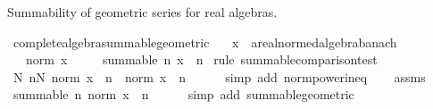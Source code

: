 \begin{isabellebody}
\isamarkupfalse%
%
\endisatagproof
{\isafoldproof}%
%
\isadelimproof
%
\endisadelimproof
%
\begin{isamarkuptext}%
Summability of geometric series for real algebras.%
\end{isamarkuptext}\isamarkuptrue%
\isamarkupfalse%
\ complete{\isacharunderscore}{\kern0pt}algebra{\isacharunderscore}{\kern0pt}summable{\isacharunderscore}{\kern0pt}geometric{\isacharcolon}{\kern0pt}\isanewline
\ \ \ x\ {\isacharcolon}{\kern0pt}{\isacharcolon}{\kern0pt}\ {\isachardoublequoteopen}{\isacharprime}{\kern0pt}a{\isacharcolon}{\kern0pt}{\isacharcolon}{\kern0pt}{\isacharbraceleft}{\kern0pt}real{\isacharunderscore}{\kern0pt}normed{\isacharunderscore}{\kern0pt}algebra{\isacharunderscore}{\kern0pt}{}{\isacharcomma}{\kern0pt}banach{\isacharbraceright}{\kern0pt}{\isachardoublequoteclose}\isanewline
\ \ \ {\isachardoublequoteopen}norm\ x\ {\isacharless}{\kern0pt}\ {}{\isachardoublequoteclose}\isanewline
\ \ \ {\isachardoublequoteopen}summable\ {\isacharparenleft}{\kern0pt}{\isasymlambda}n{\isachardot}{\kern0pt}\ x\ {\isacharcircum}{\kern0pt}\ n{\isacharparenright}{\kern0pt}{\isachardoublequoteclose}\isanewline
%
\isadelimproof
%
\endisadelimproof
%
\isatagproof
{}\isamarkupfalse%
\ {\isacharparenleft}{\kern0pt}rule\ summable{\isacharunderscore}{\kern0pt}comparison{\isacharunderscore}{\kern0pt}test{\isacharparenright}{\kern0pt}\isanewline
\ \ \isamarkupfalse%
\ {\isachardoublequoteopen}{\isasymexists}N{\isachardot}{\kern0pt}\ {\isasymforall}n{\isasymge}N{\isachardot}{\kern0pt}\ norm\ {\isacharparenleft}{\kern0pt}x\ {\isacharcircum}{\kern0pt}\ n{\isacharparenright}{\kern0pt}\ {\isasymle}\ norm\ x\ {\isacharcircum}{\kern0pt}\ n{\isachardoublequoteclose}\isanewline
\ \ \ \ \isamarkupfalse%
\ {\isacharparenleft}{\kern0pt}simp\ add{\isacharcolon}{\kern0pt}\ norm{\isacharunderscore}{\kern0pt}power{\isacharunderscore}{\kern0pt}ineq{\isacharparenright}{\kern0pt}\isanewline
\ \ \isamarkupfalse%
\ assms\ \isamarkupfalse%
\ {\isachardoublequoteopen}summable\ {\isacharparenleft}{\kern0pt}{\isasymlambda}n{\isachardot}{\kern0pt}\ norm\ x\ {\isacharcircum}{\kern0pt}\ n{\isacharparenright}{\kern0pt}{\isachardoublequoteclose}\isanewline
\ \ \ \ \isamarkupfalse%
\ {\isacharparenleft}{\kern0pt}simp\ add{\isacharcolon}{\kern0pt}\ summable{\isacharunderscore}{\kern0pt}geometric{\isacharparenright}{\kern0pt}\isanewline
{}\isamarkupfalse%

\end{isabellebody}
